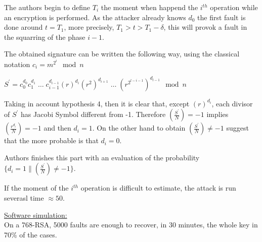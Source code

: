 The authors begin to define $T_i$ the moment when happend the $i^{th}$ operation 
while an encryption is performed. As the attacker already knows $d_0$ 
the first fault is done around  $t=T_1$, more precisely, $T_1 > t > T_1 -\delta$,
this will provok a fault in the squarring of the phase $i-1$.

The obtained signature can be written the following way, using the classical notation 
$c_i = m^{2^i} \mod n$
\begin{center}
$
S^{'} = 
c_0^{d_0}   c_1^{d_1}     \; \hdots \;         c_{i-1}^{d_{i-1}}
(r)^{d_i} (r^2)^{d_{i+1}} \; \hdots \; (r^{2^{l-i-1}})^{d_{l-1}}
 \mod n
$
\end{center}
Taking in account hypothesis 4, then it is clear that, except $ (r)^{d_i} $, 
each divisor of $S^{'}$ has Jacobi Symbol different from -1.
Therefore $\left( \frac{S^{'}}{N} \right)= -1$ implies
$\left( \frac{r^{d_i}}{N} \right)= -1$ and then $d_i = 1$. 
On the other hand to obtain $\left( \frac{S^{'}}{N} \right) \neq -1$ 
suggest that the more probable is that $d_i =0$. 

Authors finishes this part with an evaluation of the
probability $\{ d_i=1 \| \left( \frac{S^{'}}{N} \right) \neq -1 \}$.

If the moment of the $i^{th}$ operation is difficult to estimate,
the attack is run severasl time $ \approx 50$.

\underline{Software simulation:}\\
On a 768-RSA, 5000 faults are enough to recover, in 30 minutes,
the whole key in 70\% of the cases.





	
	
